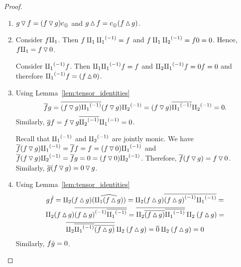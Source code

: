 \begin{proof}
  \prepprooflist
  \begin{enumerate}[{(}i{)}]
    \item $g \tjleft f = (f \tjleft g)\comp $ and $g \tjright f = \comp(f\tjright g)$.
    \item Consider $f \cpa$. Then $f \cpa \icpa = f$ and
      $f \cpa \icpb = f 0 = 0$. Hence, $f \cpa = f \tjleft 0$.

      Consider $\icpa f$. Then $\cpa \icpa f = f$ and
      $\cpb \icpa f = 0 f = 0$ and therefore $\icpa f = (f\tjright 0)$.
    \item Using Lemma~\ref{lem:tensor_identities}
      \[
        \rst{f}g = \rst{(f\tjleft g)\icpa} (f\tjleft g)\icpb =
          (f\tjleft g) \rst{\icpa} \icpb = 0.
      \]
      Similarly, $\rst{g}f = f\tjleft g \rst{\icpb}\icpa = 0$.

      Recall that $\icpa$ and $\icpb$ are jointly monic. We have
      $\rst{f}(f \tjleft g) \icpa = \rst{f} f = f = (f\tjleft 0) \icpa$ and
      $\rst{f}(f \tjleft g) \icpb = \rst{f}g = 0= (f\tjleft 0) \icpb$.
      Therefore, $\rst{f}(f \tjleft g) = f \tjleft 0$. Similarly,
      $\rst{g}(f \tjleft g) = 0 \tjleft g$.
    \item Using Lemma~\ref{lem:tensor_identities}
      \begin{multline*}
        g\rg{f} = \cpb(f\tjright g)\wrg{(\cpa(f\tjright g))}  =
          \cpb(f\tjright g) \rst{\inv{(f\tjright g)}\icpa} =\\
          \cpb(f\tjright g) \rst{\inv{(f\tjright g)}\rst{\icpa}} =
          \rst{\cpb \rst{(f\tjright g)} \rst{\icpa}}\cpb(f\tjright g) = \\
          \rst{\cpb \rst{\icpa}\rst{(f\tjright g)} }\cpb(f\tjright g) =
          \rst{0}\cpb(f\tjright g) = 0
      \end{multline*}
      Similarly, $f\rg{g} =  0$.


\end{enumerate}
\end{proof}
